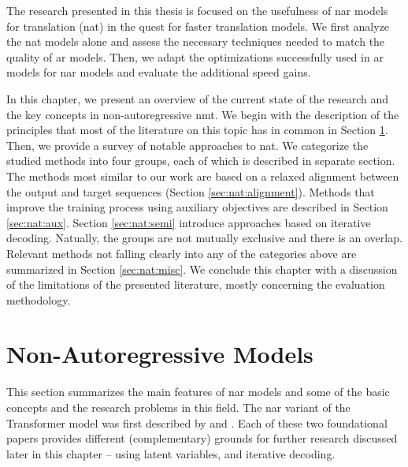 The research presented in this thesis is focused on the usefulness of \ac{nar}
models for translation (\acs{nat}) in the quest for faster
translation models. We first analyze the \ac{nat} models alone and assess the
necessary techniques needed to match the quality of \ac{ar} models.  Then, we
adapt the optimizations successfully used in \ac{ar} models for \ac{nar} models
and evaluate the additional speed gains. 

In this chapter, we present an overview of the current state of the research
and the key concepts in non-autoregressive \ac{nmt}. We begin with the
description of the principles that most of the literature on this topic has in
common in Section \ref{sec:nat:principles}. Then, we provide a survey of
notable approaches to \ac{nat}. We categorize the studied methods into four
groups, each of which is described in separate section. The methods most
similar to our work are based on a relaxed alignment between the output and
target sequences (Section \ref{sec:nat:alignment}). Methods that improve the
training process using auxiliary objectives are described in Section
\ref{sec:nat:aux}. Section \ref{sec:nat:semi} introduce approaches based on
iterative decoding. Natually, the groups are not mutually exclusive and there
is an overlap. Relevant methods not falling clearly into any of the categories
above are summarized in Section \ref{sec:nat:misc}.  We conclude this chapter
with a discussion of the limitations of the presented literature, mostly
concerning the evaluation methodology.


\section{Non-Autoregressive Models}%
\label{sec:nat:principles}

This section summarizes the main features of \ac{nar} models and some of the
basic concepts and the research problems in this field. The \ac{nar} variant of
the Transformer model was first described by \citet{gu2017nonautoregressive}
and \citet{lee-etal-2018-deterministic}. Each of these two foundational papers
provides different (complementary) grounds for further research discussed later
in this chapter -- using latent variables, and iterative decoding.

